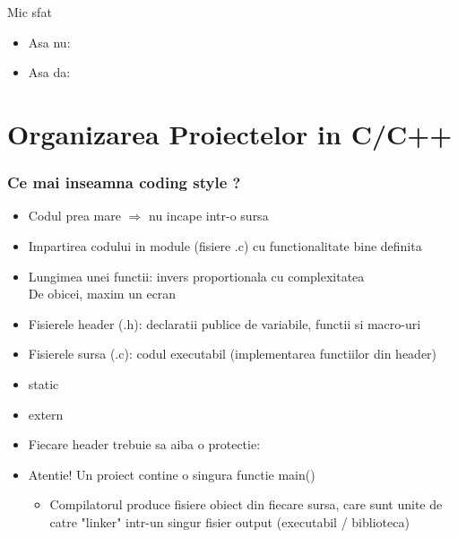 \documentclass{beamer}
\begin{document}
  \begin{frame}{Mic sfat}
  \begin{itemize}
  \item Asa nu:\\
  \vspace{0.4cm}
  
  \item Asa da:\\
  \vspace{0.4cm}
  
  \end{itemize}
  \end{frame}


\section{Organizarea Proiectelor in C/C++}
  
  \frame{\tableofcontents[currentsection]}

  \begin{frame}[allowframebreaks]  
  \frametitle{Ce mai inseamna coding style ?}
  \begin{itemize}
  \setlength{\itemsep}{0.5cm}
  \item Codul prea mare $\Rightarrow$ nu incape intr-o sursa
  \item Impartirea codului in module (fisiere .c) cu functionalitate bine definita
  \item Lungimea unei functii: invers proportionala cu complexitatea\\De obicei, maxim un ecran
  \framebreak
  \item Fisierele header (.h): declaratii publice de variabile, functii si macro-uri
  \item Fisierele sursa (.c): codul executabil (implementarea functiilor din header)
  \vspace{1cm}
  \item {\ttfamily static}
  \item {\ttfamily extern}
  \framebreak
  \item Fiecare header trebuie sa aiba o protectie:\\
  \framebreak
  \item Atentie! Un proiect contine o singura functie {\ttfamily main()}\begin{itemize} \item Compilatorul produce fisiere obiect din fiecare sursa, care sunt unite de catre "linker" intr-un singur fisier output (executabil / biblioteca)\end{itemize}
  \end{itemize}
  \end{frame}
\end{document}
